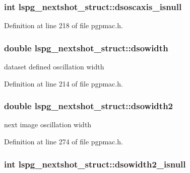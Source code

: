 \hypertarget{structlspg__nextshot__struct_a51a26391afcacfb4c946fb9e8e9ab6b0}{
\subsubsection[{dsoscaxis\-\_\-isnull}]{\setlength{\rightskip}{0pt plus 5cm}int lspg\-\_\-nextshot\-\_\-struct\-::dsoscaxis\-\_\-isnull}}\label{structlspg__nextshot__struct_a51a26391afcacfb4c946fb9e8e9ab6b0}


Definition at line 218 of file pgpmac.\-h.

\hypertarget{structlspg__nextshot__struct_ad5a8f568a04aa6a13767933062b28f19}{
\subsubsection[{dsowidth}]{\setlength{\rightskip}{0pt plus 5cm}double lspg\-\_\-nextshot\-\_\-struct\-::dsowidth}}\label{structlspg__nextshot__struct_ad5a8f568a04aa6a13767933062b28f19}


dataset defined oscillation width 



Definition at line 214 of file pgpmac.\-h.

\hypertarget{structlspg__nextshot__struct_a5378e13735a5392a9fcd853ce8c9e929}{
\subsubsection[{dsowidth2}]{\setlength{\rightskip}{0pt plus 5cm}double lspg\-\_\-nextshot\-\_\-struct\-::dsowidth2}}\label{structlspg__nextshot__struct_a5378e13735a5392a9fcd853ce8c9e929}


next image oscillation width 



Definition at line 274 of file pgpmac.\-h.

\hypertarget{structlspg__nextshot__struct_a5ffd27b8063506fd54162658e5c2ce8a}{
\subsubsection[{dsowidth2\-\_\-isnull}]{\setlength{\rightskip}{0pt plus 5cm}int lspg\-\_\-nextshot\-\_\-struct\-::dsowidth2\-\_\-isnull}}\label{structlspg__nextshot__struct_a5ffd27b8063506fd54162658e5c2ce8a}


